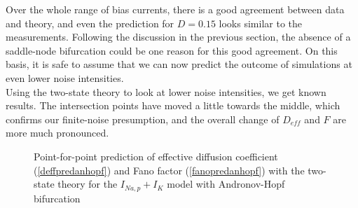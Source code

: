 \documentclass[12pt,a4paper]{article}
\begin{document}
Over the whole range of bias currents, there is a good agreement between data and theory, and even the prediction for $D=0.15$ looks similar to the measurements. Following the discussion in the previous section, the absence of a saddle-node bifurcation could be one reason for this good agreement. On this basis, it is safe to assume that we can now predict the outcome of simulations at even lower noise intensities.\\
Using the two-state theory to look at lower noise intensities, we get known results. The intersection points have moved a little towards the middle, which confirms our finite-noise presumption, and the overall change of $D_{eff}$ and $F$ are more much pronounced.
\begin{figure}[H]
	\hspace*{-0.5cm}
	\caption{Point-for-point prediction of effective diffusion coefficient (\ref{deffpredanhopf}) and Fano factor (\ref{fanopredanhopf}) with the two-state theory for the $I_{Na,p}+I_K$ model with Andronov-Hopf bifurcation}
\end{figure}
\end{document}
